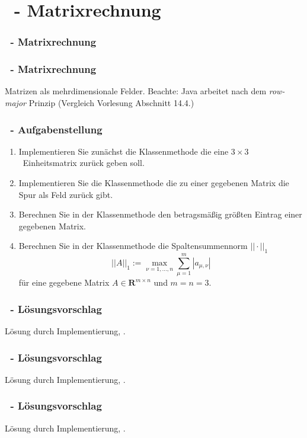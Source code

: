 \def\stitle{\theexercise\ - Matrixrechnung}

\section{\stitle}
\begin{frame}
  \frametitle{\stitle}%
\tableofcontents[current]
\end{frame}


\begin{frame}%
  \frametitle{\stitle}%
Matrizen als mehrdimensionale Felder.
Beachte: Java arbeitet nach dem \emph{row-major} Prinzip (Vergleich Vorlesung Abschnitt 14.4.)


\end{frame}


\begin{frame}%
  \frametitle{\theexercise\ - Aufgabenstellung}%

\begin{enumerate}
\item Implementieren Sie zunächst die Klassenmethode  die eine $3\times 3$~Einheitsmatrix zurück geben soll.
\item Implementieren Sie die Klassenmethode  die zu einer gegebenen Matrix die Spur als Feld zurück gibt.
\item Berechnen Sie in der Klassenmethode  den betragsmäßig größten Eintrag einer gegebenen Matrix.
\item Berechnen Sie in der Klassenmethode  die Spaltensummennorm $||\cdot||_1$  $$||A||_1 := \max_{\nu=1,\ldots,n} \sum_{\mu=1}^m |a_{\mu,\nu}| $$ für eine gegebene Matrix $A\in\mathbf{R}^{m\times n}$ und $m=n=3$.
\end{enumerate}

\end{frame}


\begin{frame}%
  \frametitle{\theexercise\ - L\"osungsvorschlag}%

L\"osung durch Implementierung, .

\end{frame}


\begin{frame}%
  \frametitle{\theexercise\ - L\"osungsvorschlag}%

L\"osung durch Implementierung, .

\end{frame}


\begin{frame}%
  \frametitle{\theexercise\ - L\"osungsvorschlag}%

L\"osung durch Implementierung, .

\end{frame}
